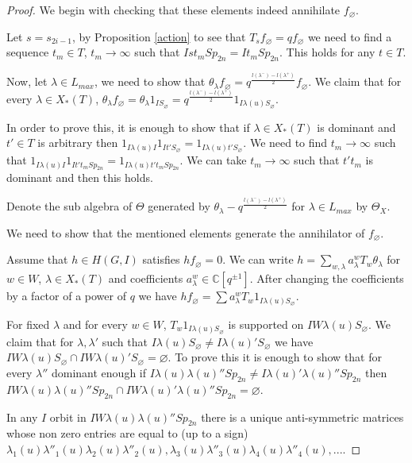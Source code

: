 \documentclass[10pt,a4paper]{amsart}
\newcommand{\C}{\mathbb{C}}
\renewcommand{\emptyset}{\varnothing}
\begin{document}
    \begin{proof}
        We begin with checking that these elements indeed annihilate $f_\emptyset$.

        Let $s=s_{2i-1}$, by Proposition \ref{action} to see that $T_sf_\emptyset=qf_\emptyset$ we need to find a sequence $t_m\in T$, $t_m\rightarrow\infty$ such that $Ist_mSp_{2n}=It_mSp_{2n}$. This holds for any $t\in T$.

        Now, let $\lambda\in L_{max}$, we need to show that $\theta_{\lambda}f_\emptyset= q^\frac{l(\lambda^-)-l(\lambda^+)}{2}f_\emptyset$. We claim that for every $\lambda\in X_*(T)$, $\theta_{\lambda}f_\emptyset=\theta_{\lambda}1_{IS_\emptyset}= q^\frac{l(\lambda^-)-l(\lambda^+)}{2}1_{I\lambda(u)S_\emptyset}$. 
        
        In order to prove this, it is enough to show that if $\lambda\in X_*(T)$ is dominant and $t'\in T$ is arbitrary then $1_{I\lambda(u)I}1_{It'S_\emptyset}=1_{I\lambda(u)t'S_\emptyset}$. We need to find $t_m\rightarrow\infty$ such that $1_{I\lambda(u)I}1_{It't_mSp_{2n}}=1_{I\lambda(u)t't_mSp_{2n}}$. We can take $t_m\rightarrow\infty$ such that $t't_m$ is dominant and then this holds.

        Denote the sub algebra of $\Theta$ generated by $\theta_{\lambda}-q^\frac{l(\lambda^-)-l(\lambda^+)}{2}$ for $\lambda\in L_{max}$ by $\Theta_X$.

        We need to show that the mentioned elements generate the annihilator of $f_\emptyset$.

        Assume that $h\in H(G,I)$ satisfies $hf_\emptyset=0$. We can write $h=\sum_{w,\lambda} a_\lambda^wT_w\theta_\lambda$ for $w\in W$, $\lambda\in X_*(T)$ and coefficients $a_\lambda^w\in \C[q^{\pm 1}]$. After changing the coefficients by a factor of a power of $q$ we have $hf_\emptyset= \sum a_\lambda^w T_w1_{I\lambda(u)S_\emptyset}$.

        For fixed $\lambda$ and for every $w\in W$, $T_w1_{I\lambda(u)S_\emptyset}$ is supported on $IW\lambda(u)S_\emptyset$. We claim that for $\lambda,\lambda'$ such that $I\lambda(u)S_\emptyset\neq I\lambda(u)'S_\emptyset$ we have $IW\lambda(u)S_\emptyset\cap IW\lambda(u)'S_\emptyset=\emptyset$. To prove this it is enough to show that for every $\lambda''$ dominant enough if $I\lambda(u)\lambda(u)''Sp_{2n}\neq I\lambda(u)'\lambda(u)''Sp_{2n}$ then $IW\lambda(u)\lambda(u)''Sp_{2n}\cap IW\lambda(u)'\lambda(u)''Sp_{2n}=\emptyset$. 
        
        In any $I$ orbit in $IW\lambda(u)\lambda(u)''Sp_{2n}$ there is a unique anti-symmetric matrices whose non zero entries are equal to (up to a sign) $\lambda_1(u)\lambda''_1(u)\lambda_2(u)\lambda''_2(u),\lambda_3(u)\lambda''_3(u)\lambda_4(u)\lambda''_4(u),...$. 
        

\end{proof}
\end{document}
